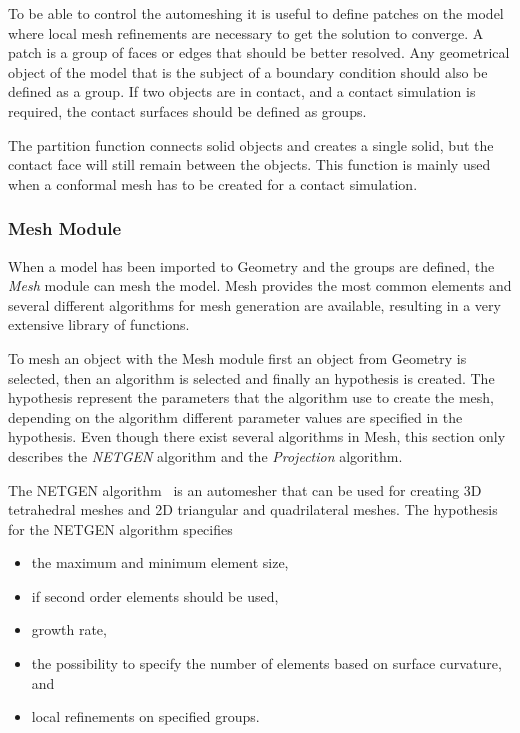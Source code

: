 To be able to control the automeshing it is useful to define patches on the model where local mesh refinements are necessary to get the solution to converge. A patch is a group of faces or edges that should be better resolved. Any geometrical object of the model that is the subject of a boundary condition should also be defined as a group. If two objects are in contact, and a contact simulation is required, the contact surfaces should be defined as groups.

The partition function connects solid objects and creates a single solid, but the contact face will still remain between the objects. This function is mainly used when a conformal mesh has to be created for a contact simulation.~\cite{salomedoc}

\subsubsection{Mesh Module} %
\label{ssub:mesh_module}
When a model has been imported to Geometry and the groups are defined, the \textit{Mesh} module can mesh the model. Mesh provides the most common elements and several different algorithms for mesh generation are available, resulting in a very extensive library of functions.

To mesh an object with the Mesh module first an object from Geometry is selected, then an algorithm is selected and finally an hypothesis is created. The hypothesis represent the parameters that the algorithm use to create the mesh, depending on the algorithm different parameter values are specified in the hypothesis. Even though there exist several algorithms in Mesh, this section only describes the \textit{NETGEN} algorithm and the \textit{Projection} algorithm.

The NETGEN algorithm~\cite{netgen} is an automesher that can be used for creating 3D tetrahedral meshes and 2D triangular and quadrilateral meshes. The hypothesis for the NETGEN algorithm specifies
\begin{itemize}
	\item the maximum and minimum element size, 
	\item if second order elements should be used,
	\item growth rate,
	\item the possibility to specify the number of elements based on surface curvature, and
	\item local refinements on specified groups. 
\end{itemize}


